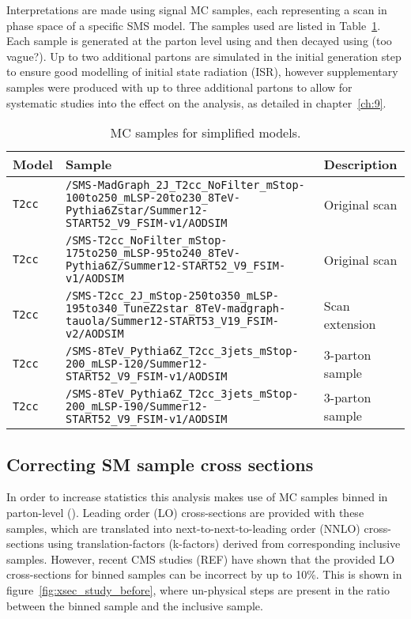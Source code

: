 Interpretations are made using signal MC samples, each representing a scan in 
phase space of a specific SMS model. The samples used are listed in
Table~\ref{tab:mc-signal}. Each sample is generated at the parton level using \MADGRAPH and then
decayed using \PYTHIA (too vague?). Up to two additional partons are simulated 
in the initial generation step to ensure good modelling of initial state 
radiation (ISR), however supplementary samples were produced with up to three
additional partons to allow for systematic studies into the effect on the 
analysis, as detailed in chapter~\ref{ch:9}.

\begin{landscape}
  \begin{center}
    \begin{table}[ht]
      \caption{MC samples for simplified models.}
      \label{tab:mc-signal}
      \centering
      \tiny
      \begin{tabular}{ lll }
        \hline
        Model & Sample & Description \\
        \hline
        \hline
        \verb!T2cc! & \verb!/SMS-MadGraph_2J_T2cc_NoFilter_mStop-100to250_mLSP-20to230_8TeV-Pythia6Zstar/Summer12-START52_V9_FSIM-v1/AODSIM! & Original scan \\
        \verb!T2cc! & \verb!/SMS-T2cc_NoFilter_mStop-175to250_mLSP-95to240_8TeV-Pythia6Z/Summer12-START52_V9_FSIM-v1/AODSIM! & Original scan \\
        \verb!T2cc! & \verb!/SMS-T2cc_2J_mStop-250to350_mLSP-195to340_TuneZ2star_8TeV-madgraph-tauola/Summer12-START53_V19_FSIM-v2/AODSIM! & Scan extension \\
        \verb!T2cc! & \verb!/SMS-8TeV_Pythia6Z_T2cc_3jets_mStop-200_mLSP-120/Summer12-START52_V9_FSIM-v1/AODSIM! & 3-parton sample \\
        \verb!T2cc! & \verb!/SMS-8TeV_Pythia6Z_T2cc_3jets_mStop-200_mLSP-190/Summer12-START52_V9_FSIM-v1/AODSIM! & 3-parton sample \\
        \hline
        \hline
      \end{tabular}
    \end{table}
  \end{center}
\end{landscape}

\subsection{Correcting SM sample cross sections}
\label{sec:mc_xsec_corrs}
In order to increase statistics this analysis makes use of MC samples binned in 
parton-level \HT (\HTpart). Leading order (LO) cross-sections are provided with 
these samples, which are translated into next-to-next-to-leading order (NNLO) 
cross-sections using translation-factors (k-factors) derived from corresponding 
inclusive samples. However, recent CMS studies (REF) have shown that the 
provided LO cross-sections for \HTpart binned samples can 
be incorrect by up to 10\%. This is shown in figure~\ref{fig:xsec_study_before},
where un-physical steps are present in the ratio between the \zj binned sample 
and the \dyj inclusive sample.

